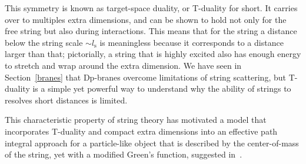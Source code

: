 \documentclass{article}
\begin{document}
This symmetry is known as 
target-space duality, or T-duality for short. It carries over to multiples extra dimensions, and can be shown to hold not only for the free string but 
also during interactions. This means that for
the string a distance below the string scale $\sim l_{\mathrm{s}}$ is meaningless because it corresponds to a distance
larger than that; pictorially, a string that is highly excited also has enough energy
to stretch and wrap around the extra dimension. We have seen in Section~\ref{branes} that Dp-branes overcome
limitations of string scattering, but T-duality is a simple yet powerful
way to understand why the ability of strings to resolves short distances is limited.

This characteristic property of string theory has motivated a model that incorporates T-duality and compact extra dimensions into an effective 
path integral approach for a particle-like object that is described by the center-of-mass of the
string, yet with a modified Green's function, suggested in~\cite{Smailagic:2003hm,Fontanini:2005ik,Spallucci:2005bm}. 
\end{document}

